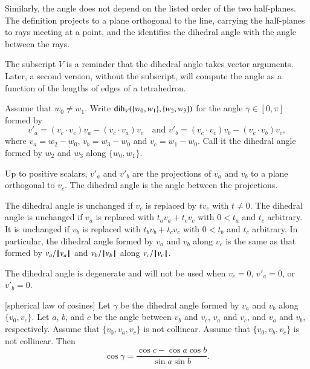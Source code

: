 Similarly, the angle does not depend on the listed order of the two half-planes.  The definition projects to a plane orthogonal to the line, carrying the half-planes to rays meeting at a point, and the identifies the dihedral angle with the angle between the rays.

The subscript $V$ is a reminder 
that the dihedral angle takes vector arguments.
Later, a second version, without the subscript, will
compute the angle as a function of the lengths of edges of a 
tetrahedron.


\begin{definition}\label{def:dih} Assume that $w_0\ne w_1$.
Write $\operatorname{dih}_V(\{w_0,w_1\},\{w_2,w_3\})$ for the angle $\gamma\in[0,\pi]$
formed
by 
    $$
    v'_a = (v_c\cdot v_c) v_a - (v_c\cdot v_a) v_c\quad\text{and }v'_b =
            (v_c\cdot v_c) v_b - (v_c\cdot v_b) v_c,
    $$
where $v_a = w_2-w_0$, $v_b=w_3-w_0$ and $v_c=w_1-w_0$.  Call it
the dihedral angle formed by $w_2$ and $w_3$ along $\{w_0,w_1\}$.
\end{definition}

Up to positive scalars, $v'_a$ and $v'_b$ are the projections of
$v_a$ and $v_b$ to a plane orthogonal to $v_c$.  The
dihedral angle is the angle between the projections.

The dihedral angle is unchanged if $v_c$ is replaced by $t v_c$ with
$t\ne0$. The dihedral angle is unchanged if $v_a$ is replaced with
$t_a v_a + t_c v_c$ with $0 < t_a$ and $t_c$ arbitrary.  It is unchanged if
$v_b$ is replaced with $t_b v_b + t_c v_c$ with $0 < t_b$ and $t_c$
arbitrary.  In particular, the dihedral angle formed by $v_a$ and
$v_b$ along $v_c$ is the same as that formed by $v_a/{{\hskip0.1em|\hskip-0.15em|\hskip0.1em}v_a{\hskip0.1em|\hskip-0.15em|\hskip0.1em}}$ and
$v_b/{{\hskip0.1em|\hskip-0.15em|\hskip0.1em}v_b{\hskip0.1em|\hskip-0.15em|\hskip0.1em}}$ along $v_c/{{\hskip0.1em|\hskip-0.15em|\hskip0.1em}v_c{\hskip0.1em|\hskip-0.15em|\hskip0.1em}}$.

The dihedral angle is degenerate and will not be used when $v_c =
0$, $v'_a = 0$, or $v'_b = 0$.




\begin{lemma}[spherical law of cosines]\label{lemma:sloc}
Let $\gamma$ be the dihedral angle formed by $v_a$ and $v_b$ along
$\{v_0,v_c\}$.  Let $a$, $b$, and $c$ be the
angle between $v_b$ and $v_c$, $v_a$ and $v_c$, and $v_a$ and
$v_b$, respectively. %
Assume that $\{v_0,v_a,v_c\}$ is not
collinear. Assume that $\{v_0,v_b,v_c\}$ is not collinear.
Then
    $$\cos\gamma = \frac{\cos c - \cos a \cos b}{\sin a\sin b}.$$
\end{lemma}

